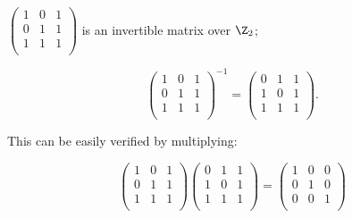\begin{example}
$\begin{pmatrix}
1 & 0 & 1 \\
0 & 1 & 1 \\
1 & 1 & 1 \\
\end{pmatrix}$ is an invertible matrix over $\Z_2$;

\[\begin{pmatrix}
1 & 0 & 1 \\
0 & 1 & 1 \\
1 & 1 & 1 \\
\end{pmatrix}^{-1}=\begin{pmatrix}
0 & 1 & 1 \\
1 & 0 & 1 \\
1 & 1 & 1 \\
\end{pmatrix}.
\]

This can be easily verified by multiplying:

\[\begin{pmatrix}
1 & 0 & 1 \\
0 & 1 & 1 \\
1 & 1 & 1 \\
\end{pmatrix}\begin{pmatrix}
0 & 1 & 1 \\
1 & 0 & 1 \\
1 & 1 & 1 \\
\end{pmatrix}=\begin{pmatrix}
1 & 0 & 0 \\
0 & 1 & 0 \\
0 & 0 & 1 \\
\end{pmatrix}
\]
\end{example}

